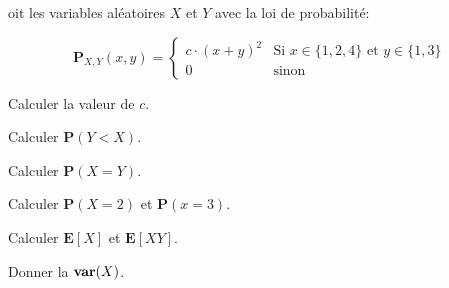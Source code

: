 \documentclass[11pt,largemargins]{homework}
\renewcommand{\P}{\mathbf{P}}
\newcommand{\E}{\mathbf{E}}
\newcommand{\var}{\text{\textbf{var}}}
\begin{document}
oit les variables aléatoires $X$ et $Y$ avec la loi de probabilité:

\begin{equation*}
  \P_{X,Y}(x,y) = \begin{cases}
    c\cdot ( x + y)^2 & \text{Si } x \in \{1,2,4\} \text{ et }
    y\in\{1,3\}\\[4pt]
    0 & \text{sinon}
  \end{cases}
\end{equation*}

  \begin{arabicparts}
      \item Calculer la valeur de $c$.
      \item Calculer $\P(Y < X)$.
      \item Calculer $\P(X = Y)$.
      \item Calculer $\P(X=2)$ et $\P(x=3)$.
      \item Calculer $\E[X]$ et $\E[XY]$.
      \item Donner la $\var(X)$.
  \end{arabicparts}
  
\end{document}
